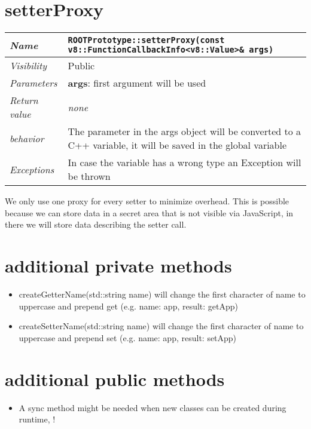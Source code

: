 \section{setterProxy}
\begin{longtable}{p{3cm} @{\hskip 1cm} p{12cm}}
  \hline
  \textit{Name} & \texttt{ROOTPrototype::setterProxy(const v8::FunctionCallbackInfo<v8::Value>\& args)} \\
  \hline
  \textit{Visibility} & Public \\
  \hline
  \textit{Parameters} & \textbf{args}: first argument will be used \\
  \hline
  \textit{Return value} & \textit{none} \\
  \hline
  \textit{behavior} & The parameter in the args object will be converted to a C++ variable, it will be saved in the global variable\\
  \hline
  \textit{Exceptions} & In case the variable has a wrong type an Exception will be thrown \\
  \hline
\end{longtable}
We only use one proxy for every setter to minimize overhead. This is possible because we can store data in a secret area that is not visible via JavaScript, in there we will store data describing the setter call.
\newpage
\section{additional private methods}
\begin{itemize}
  \item createGetterName(std::string name) will change the first character of name to uppercase and prepend get (e.g. name: app, result: getApp)
  \item createSetterName(std::string name) will change the first character of name to uppercase and prepend set (e.g. name: app, result: setApp)
\end{itemize}
\section{additional public methods}
\begin{itemize}
  \item A sync method might be needed when new classes can be created during runtime, \color{red}{need to evaluate this}!
\end{itemize}
